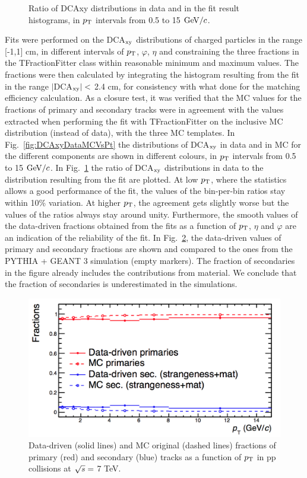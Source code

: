 \begin{enumerate}
\begin{figure}[!hb]
\begin{center}
\caption{Ratio of DCAxy distributions in data and in the fit result histograms, in $p_{\rm T}$ intervals from 0.5 to 15 $\mathrm{GeV}/c$.}
\label{fig:DCAxyRatioDataFitVsPt}
\end{center}
\end{figure}
Fits were performed on the DCA$_{\rm xy}$ distributions of charged particles 
in the range [-1,1] cm, in different intervals of $p_{\rm T}$, $\varphi$, $\eta$ 
and constraining the three fractions in the TFractionFitter class within reasonable minimum and maximum values.
The fractions were then calculated by integrating the histogram 
resulting from the fit in the range $|$DCA$_{\rm xy}|<$ 2.4 cm, for
consistency with what done for the matching efficiency calculation. 
As a closure test, it was verified that the MC values for the fractions of primary and secondary tracks 
were in agreement with the values extracted when performing the fit with TFractionFitter 
on the inclusive MC distribution (instead of data), with the three MC templates.  
In Fig.~\ref{fig:DCAxyDataMCVsPt} the distributions of DCA$_{\rm xy}$ 
in data and in MC for the different components are
shown in different colours, in $p_{\rm T}$ intervals from 0.5 to 15 $\mathrm{GeV}/c$. 
In Fig.~\ref{fig:DCAxyRatioDataFitVsPt} the ratio of DCA$_{\rm xy}$ distributions 
in data to the distribution resulting from the fit are plotted.
At low $p_{\rm T}$, where the statistics allows a good performance of the fit, 
the values of the bin-per-bin ratios stay within 10\% variation. At higher $p_{\rm T}$,
the agreement gets slightly worse but the values of the ratios always stay 
around unity. Furthermore, the smooth values of the data-driven
fractions obtained from the fits as a function of $p_{\rm T}$, $\eta$ and $\varphi$
are an indication of the reliability of the fit.
In Fig.~\ref{fig:Fractions}, the data-driven values of primary and secondary
 fractions are shown and compared to 
 the ones from the PYTHIA + GEANT 3 simulation (empty markers). 
The fraction of secondaries in the figure already includes the contributions 
from material. We conclude that the fraction of secondaries is underestimated in the simulations.
\begin{figure}[!hb]
\begin{center}
\includegraphics[width=.6\textwidth]{FigCap4/MEfractions.png}
\caption{Data-driven (solid lines) and MC original (dashed lines) fractions of primary (red) and secondary (blue) tracks as a function of $p_{\rm T}$ in pp collisions at $\sqrt{s} = $ 7 TeV.}
\label{fig:Fractions}
\end{center}
\end{figure}


\end{enumerate}

